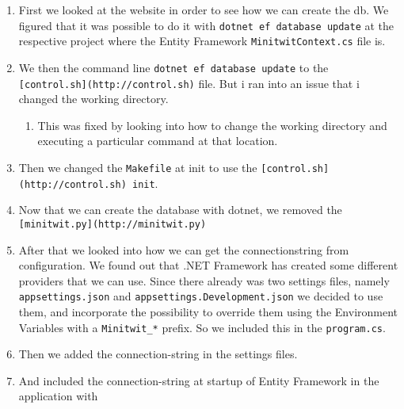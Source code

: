 \begin{enumerate}
    \item First we looked at the website in order to see how we can create the db. We figured that it was possible to do it with \texttt{dotnet\ ef\ database\ update} at the respective project where the Entity Framework \texttt{MinitwitContext.cs} file is.
    \item We then the command line \texttt{dotnet\ ef\ database\ update} to the \texttt{{[}control.sh{]}(http://control.sh)} file. But i ran into an issue that i changed the working directory.

    \begin{enumerate}
        \item This was fixed by looking into how to change the working directory and executing a particular command at that location.
    \end{enumerate}
    \item Then we changed the \texttt{Makefile} at init to use the \texttt{{[}control.sh{]}(http://control.sh)\ init}.
    \item Now that we can create the database with dotnet, we removed the \texttt{{[}minitwit.py{]}(http://minitwit.py)}
    \item After that we looked into how we can get the connectionstring from configuration. We found out that .NET Framework has created some different providers that we can use. Since there already was two settings files, namely \texttt{appsettings.json} and \texttt{appsettings.Development.json} we decided to use them, and incorporate the possibility to override them using the Environment Variables with a \texttt{Minitwit\_*} prefix. So we included this in the \texttt{program.cs}.

    \item Then we added the connection-string in the settings files.
    \item And included the connection-string at startup of Entity Framework in the application with


\end{enumerate}
